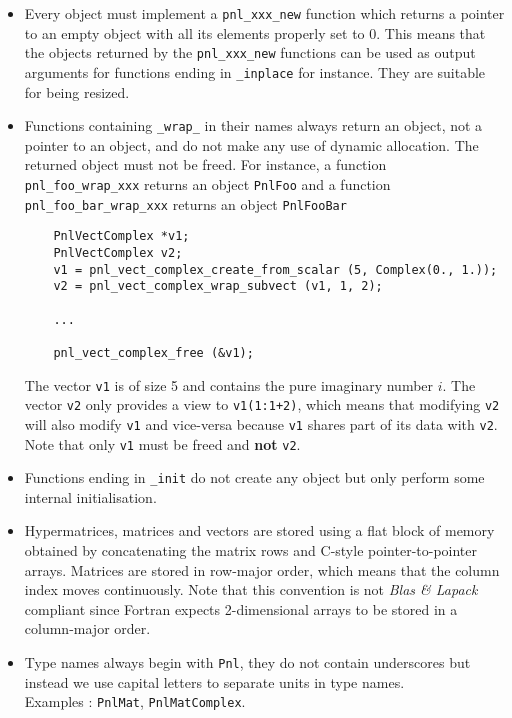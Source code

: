 \documentclass[a4paper,11pt,twoside]{article}
\begin{document}
\begin{itemize}
  \item Every object must implement a \verb!pnl_xxx_new! function which returns
    a pointer to an empty object with all its elements properly set to $0$. This
    means that the objects returned by the \verb!pnl_xxx_new! functions can be
    used as output arguments for functions ending in \verb!_inplace! for
    instance. They are suitable for being resized. 

  \item Functions containing \verb!_wrap_! in their names always return an
    object, not a pointer to an object, and do not make any use of dynamic
    allocation. The returned object must not be freed. 
    For instance, a function \verb!pnl_foo_wrap_xxx! returns an object
    \verb!PnlFoo! and a function \verb!pnl_foo_bar_wrap_xxx! returns an object
    \verb!PnlFooBar! 
    \begin{verbatim}
    PnlVectComplex *v1;
    PnlVectComplex v2;
    v1 = pnl_vect_complex_create_from_scalar (5, Complex(0., 1.));
    v2 = pnl_vect_complex_wrap_subvect (v1, 1, 2);

    ...

    pnl_vect_complex_free (&v1);
    \end{verbatim}
    The vector \verb!v1! is of size 5 and contains the pure imaginary number
    $i$. The vector \verb!v2! only provides a view to \verb!v1(1:1+2)!, which
    means that modifying \verb!v2! will also modify \verb!v1! and vice-versa
    because \verb!v1! shares part of its data with \verb!v2!. Note that only
    \verb!v1! must be freed and {\bf not} \verb!v2!.
  
  \item Functions ending in \verb!_init! do not create any object but only
    perform some internal initialisation.
  
  \item Hypermatrices, matrices and vectors are stored using a flat block of
    memory obtained by concatenating the matrix rows and C-style
    pointer-to-pointer arrays. Matrices are stored in row-major order, which
    means that the column index moves continuously.
    Note that this convention is not \textit{Blas \& Lapack} compliant since
    Fortran expects 2-dimensional arrays to be stored in a column-major order.

  \item Type names always begin with \verb!Pnl!, they do not contain underscores
    but instead we use capital letters to separate units in type names. \\
    Examples : \verb!PnlMat!, \verb!PnlMatComplex!.


\end{itemize}
\end{document}
